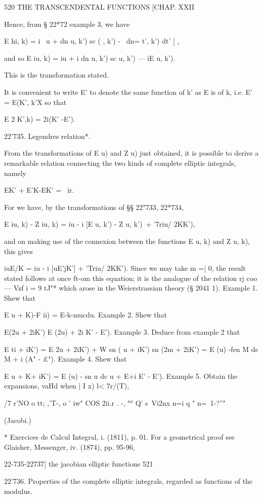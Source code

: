 520 THE TRANSCENDENTAL FUNCTIONS [CHAP. XXII

Hence, from § 22*72 example 3, we have

E hi, k) = i \ u + dn u, k') sc ( , k') - \ dn= t', k') dt' [ ,

and so E iu, k) = iu + i dn u, k') sc u, k') — iE u, k').

This is the transformation stated.

It is convenient to write E' to denote the same function of k' as E is
of k, i.e. E' = E(K', k'X so that

E 2 K',k) = 2i(K' -E').

22'735. Legendres relation*.

From the transformations of E u) and Z u) just obtained, it is
possible to derive a remarkable relation connecting the two kinds of
complete elliptic integrals, namely

EK' + E'K-EK' = \ ir.

For we have, by the transformations of §§ 22"733, 22*734,

E iu, k) - Z iu, k) = iu - i [E u, k') - Z u, k')\ + '7riu/ 2KK'),

and on making use of the connexion between the functions E u, k) and Z
u, k), this gives

iuE/K = iu - i [uE'jK'] + 'Triu/ 2KK'). Since we may take m =| 0, the
result stated follows at once ft-om this equation; it is the analogue
of the relation rj coo — Vzf i = 9 tJ"* which arose in the
Weierstrassian theory (§ 2041 1). Example 1. Shew that

E u + K)-F ii) = E-k-mucdu. Example 2. Shew that

E(2u + 2iK') E (2u) + 2i K' - E'). Example 3. Deduce from example 2
that

E ti + iK') = E 2u + 2iK') + W sn ( u + iK') sn (2m + 2iK') = E (u)
-fen M ds M + i (A" - £"). Example 4. Shew that

E u + K+ iK') = E (u) - sn u dc u + E+i E' - E'). Example 5. Obtain
the expansions, vaHd when | I x) l< 7r/(T),

/7 r'NO o tt; ,'T-, o ' iw" COS 2ii.r . -, °° Q' s\ Vi2nx n=i q " n=\
1-?''"

(Jacobi.)

* Exercices de Calcul Integral, i. (1811), p. 01. For a geometrical
proof see Glaisher, Messenger, iv. (1874), pp. 95-96,

22-735-22737] the jacobian elliptic functions 521

22'736. Properties of the complete elliptic integrals, regarded as
functions of the modulus.

